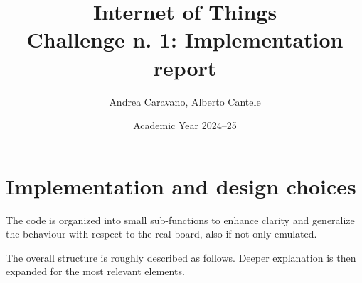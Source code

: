 \documentclass[a4paper,11pt]{article} %
\begin{document}
    \pagestyle{fancy}
    \fancyhead{}\fancyfoot{}
    \fancyfoot[C]{\thepage}

    \title{\textbf{Internet of Things}\\Challenge n. 1: Implementation report}
    \author{Andrea Caravano, Alberto Cantele}
    \date{Academic Year 2024--25}
    \maketitle


    \section{Implementation and design choices}\label{sec:implementation-and-design-choices}

    The code is organized into small sub-functions to enhance clarity and generalize the behaviour with respect to the real board, also if not only emulated.

    The overall structure is roughly described as follows.
    Deeper explanation is then expanded for the most relevant elements.
\end{document}
